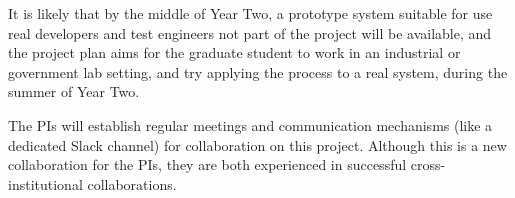 It is likely that
by the middle of Year Two, a prototype system suitable for use real
developers and test engineers not part of the project will be available, and the
project plan aims for the graduate student to work in an industrial or
government lab setting, and try applying the process to a real system, during
the summer of Year Two.

The PIs will establish regular meetings and communication mechanisms (like a
dedicated Slack channel) for collaboration on this project.  Although this is a
new collaboration for the PIs, they are both experienced in successful
cross-institutional collaborations.
